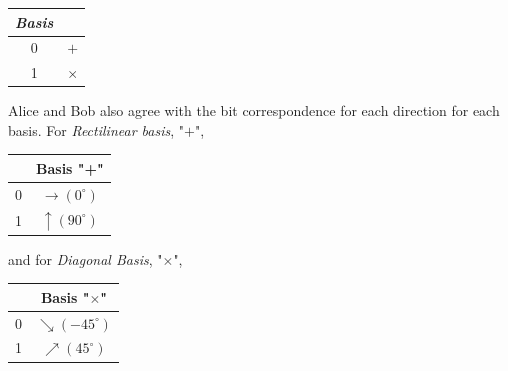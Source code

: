 \begin{table}[H]
\centering
\begin{tabular}{c|c}
\textbf{\textit{Basis}}         &  \\ \hline
 0 & $+$ \\
 1 & $\times$ \\
\end{tabular}
\end{table}
Alice and Bob also agree with the bit correspondence for each direction for each basis. For \textit{Rectilinear basis}, "$+$",

\begin{table}[H]
\centering
\begin{tabular}{c|c}
            & Basis "+" \\ \hline
 0 & $\to (0^{\circ})$ \\
 1 & $\uparrow (90^{\circ})$ \\
\end{tabular}
\end{table}
and for \textit{Diagonal Basis}, "$\times$",

\begin{table}[H]
\centering
\begin{tabular}{c|c}
      & Basis "$\times$" \\ \hline
 0 & $\searrow (-45^{\circ})$ \\
 1 & $\nearrow (45^{\circ})$ \\
\end{tabular}
\end{table}

